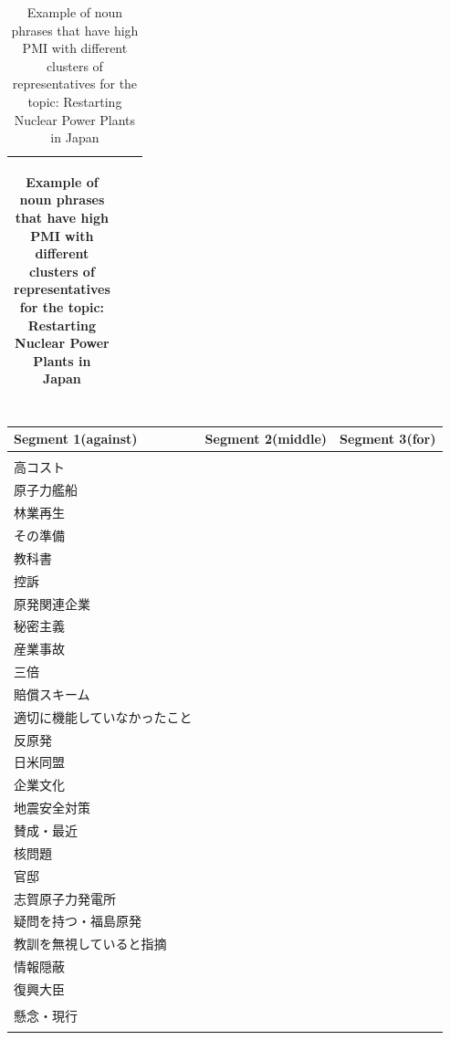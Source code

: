 \documentclass[final,5p,times,twocolumn,authoryear]{elsarticle}
\begin{document}
\begin{table}[htbp]
\begin{CJK}{UTF8}{min}
\begin{tabularx}{\textwidth}{|>{\centering\arraybackslash}X|>{\centering\arraybackslash}X|>{\centering\arraybackslash}X|}
\begin{tabular}[c]{@{}l@{}}
\end{tabular} \\ \hline
\end{tabularx}
\caption{Example of noun phrases that have high PMI with different clusters of representatives for the topic: Restarting Nuclear Power Plants in Japan}
\label{table:PMI-nuclear-jp}
\end{CJK}
\end{table}


\begin{table}[htbp]
\begin{CJK}{UTF8}{min}
\centering
\renewcommand{\arraystretch}{1.5}%
\begin{tabularx}{\textwidth}{|>{\centering\arraybackslash}X|>{\centering\arraybackslash}X|>{\centering\arraybackslash}X|}
\hline
\textbf{Segment 1(against)} & \textbf{Segment 2(middle)} & \textbf{Segment 3(for)} \\ \hline
\begin{tabular}[c]{@{}l@{}}
	自然エネルギー重視 \\ 高コスト \\ 原子力艦船 \\ 林業再生 \\ その準備 \\ 教科書 \\ 控訴 \\ 原発関連企業 \\ 秘密主義 \\ 産業事故 \\ 三倍 \\ 賠償スキーム \\ 適切に機能していなかったこと \\ 反原発 \\ 日米同盟 \\ 企業文化 \\ 地震安全対策 \\ 賛成・最近 \\ 核問題 \\ 官邸 \\ 志賀原子力発電所 \\ 疑問を持つ・福島原発 \\ 教訓を無視していると指摘 \\ 情報隠蔽 \\ 復興大臣 \\ 懸念・現行
\end{tabular} 
& 
\begin{tabular}[c]{@{}l@{}}

\end{tabular}
\end{tabularx}
\end{CJK}
\end{table}
\end{document}
